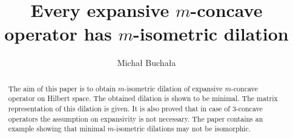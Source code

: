 \documentclass{amsart}
\theoremstyle{definition}
\numberwithin{equation}{section}
\begin{document}
	\title{Every expansive $ m $-concave operator has $ m $-isometric dilation}
	\author{Michał Buchała}
	
	\address{AGH University of Krakow, Faculty of Applied Mathematics, al. A. Mickiewicza 30, 30-059 Krakow}
	\begin{abstract}
        The aim of this paper is to obtain $ m $-isometric dilation of expansive $ m $-concave operator on Hilbert space. The obtained dilation is shown to be minimal. The matrix representation of this dilation is given. It is also proved that in case of 3-concave operators the assumption on expansivity is not necessary. The paper contains an example showing that minimal $ m $-isometric dilations may not be isomorphic.
	\end{abstract}
   	\maketitle
\end{document}
